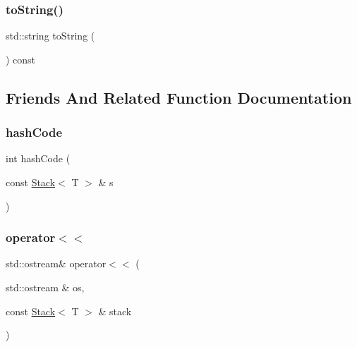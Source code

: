 \subsubsection{\texorpdfstring{to\+String()}{toString()}}
{\footnotesize\ttfamily std\+::string to\+String (\begin{DoxyParamCaption}{ }\end{DoxyParamCaption}) const}



\subsection{Friends And Related Function Documentation}
\mbox{\label{classStack_add24e0ce849c0b2045c24ee3fba490ea}} 
\subsubsection{\texorpdfstring{hash\+Code}{hashCode}}
{\footnotesize\ttfamily int hash\+Code (\begin{DoxyParamCaption}\item[{const \mbox{\hyperlink{classStack}{Stack}}$<$ T $>$ \&}]{s }\end{DoxyParamCaption})\hspace{0.3cm}{\ttfamily [friend]}}

\mbox{\label{classStack_a047eaf65350ba824d7aa36c925289d9c}} 
\subsubsection{\texorpdfstring{operator$<$$<$}{operator<<}}
{\footnotesize\ttfamily std\+::ostream\& operator$<$$<$ (\begin{DoxyParamCaption}\item[{std\+::ostream \&}]{os,  }\item[{const \mbox{\hyperlink{classStack}{Stack}}$<$ T $>$ \&}]{stack }\end{DoxyParamCaption})\hspace{0.3cm}{\ttfamily [friend]}}

